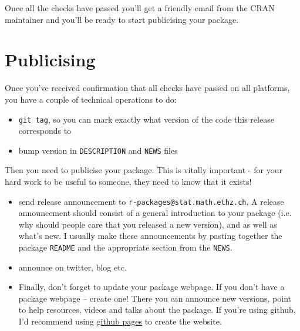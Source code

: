 Once all the checks have passed you'll get a friendly email from the
CRAN maintainer and you'll be ready to start publicising your package.

\section{Publicising}

Once you've received confirmation that all checks have passed on all
platforms, you have a couple of technical operations to do:

\begin{itemize}
\item
  \texttt{git tag}, so you can mark exactly what version of the code
  this release corresponds to
\item
  bump version in \texttt{DESCRIPTION} and \texttt{NEWS} files
\end{itemize}

Then you need to publicise your package. This is vitally important - for
your hard work to be useful to someone, they need to know that it
exists!

\begin{itemize}
\item
  send release announcement to \texttt{r-packages@stat.math.ethz.ch}. A
  release announcement should consist of a general introduction to your
  package (i.e. why should people care that you released a new version),
  and as well as what's new. I usually make these announcements by
  pasting together the package \texttt{README} and the appropriate
  section from the \texttt{NEWS}.
\item
  announce on twitter, blog etc.
\item
  Finally, don't forget to update your package webpage. If you don't
  have a package webpage -- create one! There you can announce new
  versions, point to help resources, videos and talks about the package.
  If you're using github, I'd recommend using
  \href{http://pages.github.com/}{github pages} to create the website.
\end{itemize}
